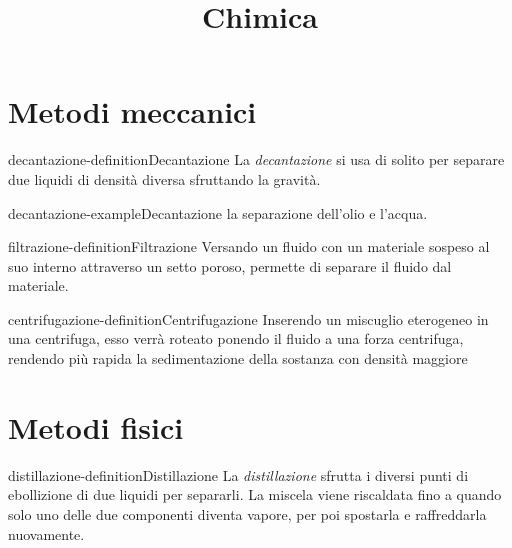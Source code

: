 \documentclass[preview]{standalone}
\begin{document}
\title{Chimica}
\genpage

\section{Metodi meccanici}


\begin{snippetdefinition}{decantazione-definition}{Decantazione}
    La \textit{decantazione} si usa di solito per separare due liquidi di densità diversa
    sfruttando la gravità.
\end{snippetdefinition}

\begin{snippetexample}{decantazione-example}{Decantazione}
    la separazione dell'olio e l'acqua.
\end{snippetexample}

\begin{snippetdefinition}{filtrazione-definition}{Filtrazione}
    Versando un fluido con un materiale sospeso al suo interno attraverso un setto poroso,
    permette di separare il fluido dal materiale.
\end{snippetdefinition}

\begin{snippetdefinition}{centrifugazione-definition}{Centrifugazione}
    Inserendo un miscuglio eterogeneo in una centrifuga, esso verrà roteato ponendo il
    fluido a una forza centrifuga, rendendo più rapida la sedimentazione della sostanza con densità maggiore
\end{snippetdefinition}

\section{Metodi fisici}


\begin{snippetdefinition}{distillazione-definition}{Distillazione}
    La \textit{distillazione} sfrutta i diversi punti di ebollizione di due liquidi per separarli.
    La miscela viene riscaldata fino a quando solo uno delle due componenti diventa vapore, per poi
    spostarla e raffreddarla nuovamente.
\end{snippetdefinition}
\end{document}
